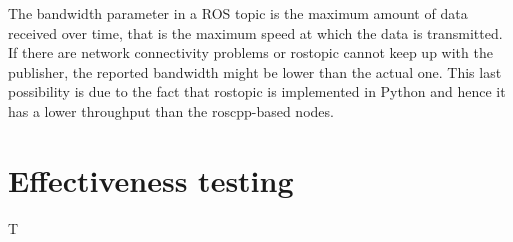 The bandwidth parameter in a ROS topic is the maximum amount of data received over time, that is the maximum speed at which the data is transmitted. If there are network connectivity problems or rostopic cannot keep up with the publisher, the reported bandwidth might be lower than the actual one. This last possibility is due to the fact that rostopic is implemented in Python and hence it has a lower throughput than the roscpp-based nodes. 



\chapter{Effectiveness testing}
T

